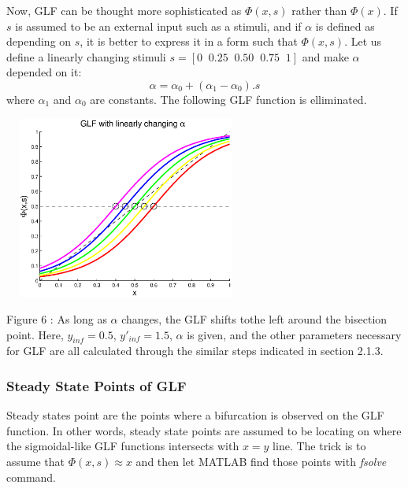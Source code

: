 \documentclass[twocolumn]{article}
\begin{document}
Now, GLF can be thought more sophisticated as $\Phi(x,s)$ rather than $\Phi(x)$. If $s$ is assumed to be an external input such as a stimuli, and if $\alpha$ is defined as depending on $s$, it is better to express it in a form such that $\Phi(x,s)$. Let us define a linearly changing stimuli  $s=[0 \;\; 0.25\;\; 0.50\;\; 0.75\;\; 1]$ and make $\alpha$ depended on it:
\begin{equation}
 \alpha=\alpha_0+(\alpha_1-\alpha_0).s
\end{equation}
where $\alpha_1$ and $\alpha_0$ are constants. The following GLF function is elliminated. 

\begin{center}
\includegraphics[width=80mm,height=60mm]{linear_alpha.eps} 
   \begin{footnotesize} Figure 6 : As long as $\alpha$ changes, the GLF shifts tothe left around the bisection point. Here, $y_{inf}=0.5$, $y'_{inf}=1.5$, $\alpha$ is given, and the other parameters necessary for GLF are all calculated through the similar steps indicated in section 2.1.3. \end{footnotesize}
\end{center}

\subsubsection{Steady State Points of GLF}
Steady states point are the points where a bifurcation is observed on the GLF function. In other words, steady state points are assumed to be locating on where the sigmoidal-like GLF functions intersects with $x=y$ line. The trick is to assume that $\Phi(x,s) \approx x$ and then let MATLAB find those points with \textit{fsolve} command.
 
\end{document}
